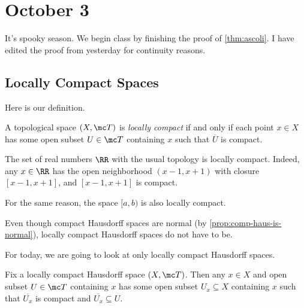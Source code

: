 \documentclass[../notes.tex]{subfiles}
\begin{document}
\section{October 3}

It's spooky season. We begin class by finishing the proof of \autoref{thm:ascoli}. I have edited the proof from yesterday for continuity reasons.

\subsection{Locally Compact Spaces}
Here is our definition.
\begin{definition}
	A topological space $(X,\mc T)$ is \textit{locally compact} if and only if each point $x\in X$ has some open subset $U\in\mc T$ containing $x$ such that $\overline U$ is compact.
\end{definition}
\begin{example}
	The set of real numbers $\RR$ with the usual topology is locally compact. Indeed, any $x\in\RR$ has the open neighborhood $(x-1,x+1)$ with closure $[x-1,x+1]$, and $[x-1,x+1]$ is compact.
\end{example}
\begin{example}
	For the same reason, the space $[a,b)$ is also locally compact.
\end{example}
\begin{remark}
	Even though compact Hausdorff spaces are normal (by \autoref{prop:comp-haus-is-normal}), locally compact Hausdorff spaces do not have to be.
\end{remark}
For today, we are going to look at only locally compact Hausdorff spaces.
\begin{lemma} \label{lem:better-loc-compact}
	Fix a locally compact Hausdorff space $(X,\mc T)$. Then any $x\in X$ and open subset $U\in\mc T$ containing $x$ has some open subset $U_x\subseteq X$ containing $x$ such that $\overline{U_x}$ is compact and $\overline{U_x}\subseteq U$.
\end{lemma}
\end{document}
